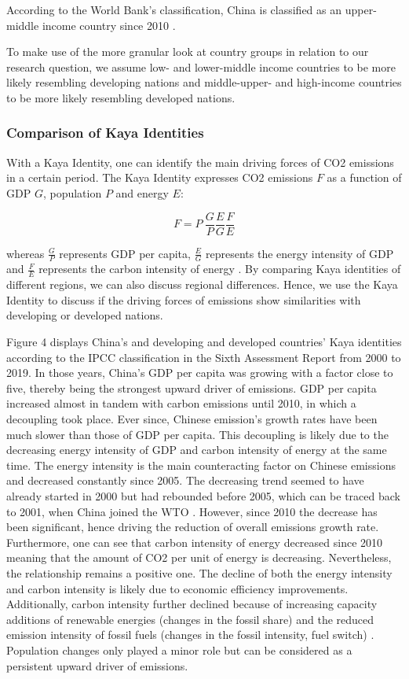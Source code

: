 \documentclass[
  12pt,
]{article}
\numberwithin{equation}{section}
\numberwithin{table}{section}
\numberwithin{figure}{section}
\begin{document}
According to the World Bank's classification, China is classified as an
upper-middle income country since 2010 \citep{WorldBank2022d}.

To make use of the more granular look at country groups in relation to
our research question, we assume low- and lower-middle income countries
to be more likely resembling developing nations and middle-upper- and
high-income countries to be more likely resembling developed nations.

\hypertarget{comparison-of-kaya-identities}{%
\subsubsection{Comparison of Kaya
Identities}\label{comparison-of-kaya-identities}}

With a Kaya Identity, one can identify the main driving forces of CO2
emissions in a certain period. The Kaya Identity expresses CO2 emissions
\(F\) as a function of GDP \(G\), population \(P\) and energy \(E\):

\[F = P \: \frac{G}{P} \frac{E}{G} \frac{F}{E}\]

whereas \(\frac{G}{P}\) represents GDP per capita, \(\frac{E}{G}\)
represents the energy intensity of GDP and \(\frac{F}{E}\) represents
the carbon intensity of energy \citep{Lamb2021}. By comparing Kaya
identities of different regions, we can also discuss regional
differences. Hence, we use the Kaya Identity to discuss if the driving
forces of emissions show similarities with developing or developed
nations.

Figure 4 displays China's and developing and developed countries' Kaya
identities according to the IPCC classification in the Sixth Assessment
Report from 2000 to 2019. In those years, China's GDP per capita was
growing with a factor close to five, thereby being the strongest upward
driver of emissions. GDP per capita increased almost in tandem with
carbon emissions until 2010, in which a decoupling took place. Ever
since, Chinese emission's growth rates have been much slower than those
of GDP per capita. This decoupling is likely due to the decreasing
energy intensity of GDP and carbon intensity of energy at the same time.
The energy intensity is the main counteracting factor on Chinese
emissions and decreased constantly since 2005. The decreasing trend
seemed to have already started in 2000 but had rebounded before 2005,
which can be traced back to 2001, when China joined the WTO
\citep{Zheng2020}. However, since 2010 the decrease has been
significant, hence driving the reduction of overall emissions growth
rate. Furthermore, one can see that carbon intensity of energy decreased
since 2010 meaning that the amount of CO2 per unit of energy is
decreasing. Nevertheless, the relationship remains a positive one. The
decline of both the energy intensity and carbon intensity is likely due
to economic efficiency improvements. Additionally, carbon intensity
further declined because of increasing capacity additions of renewable
energies (changes in the fossil share) and the reduced emission
intensity of fossil fuels (changes in the fossil intensity, fuel switch)
\citep{Zheng2020, Peters2017}. Population changes only played a minor
role but can be considered as a persistent upward driver of emissions.
\end{document}
